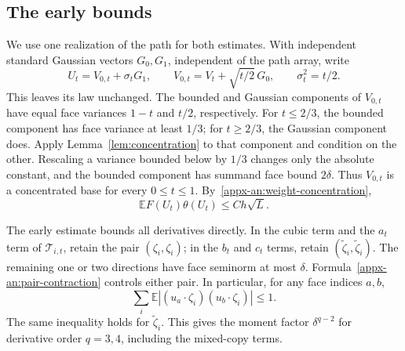 \documentclass[11pt,letterpaper]{article}
\theoremstyle{remark}
\newcommand{\E}{\mathbb E}
\begin{document}
\subsection{The early bounds}
\label{appx-an:sec:early}

We use one realization of the path for both estimates. With independent
standard Gaussian vectors \(G_0,G_1\), independent of the path array,
write
\begin{equation}
 U_t=V_{0,t}+\sigma_t G_1,\qquad
 V_{0,t}=V_t+\sqrt{t/2}\,G_0,\qquad
 \sigma_t^2=t/2.
 \label{appx-an:gaussian-split}
\end{equation}
This leaves its law unchanged. The bounded and Gaussian components
of \(V_{0,t}\) have equal face variances \(1-t\) and
\(t/2\), respectively. For \(t\le2/3\), the bounded component
has face variance at least \(1/3\); for \(t\ge2/3\), the Gaussian
component does. Apply Lemma~\ref{lem:concentration} to that component
and condition on the other. Rescaling a variance bounded below by
\(1/3\) changes only the absolute constant, and the bounded component
has summand face bound \(2\delta\). Thus \(V_{0,t}\) is a concentrated
base for every \(0\le t\le1\).
By~\eqref{appx-an:weight-concentration},
\begin{equation}
 \E F(U_t)\theta(U_t)\le Ch\sqrt L.
 \label{appx-an:path-weight}
\end{equation}

The early estimate bounds all derivatives directly. In the cubic
term and the \(a_t\) term of \(\mathcal T_{i,t}\), retain the pair
\((\zeta_i,\zeta_i)\); in the \(b_t\) and \(c_t\) terms, retain
\((\widetilde\zeta_i,\widetilde\zeta_i)\). The remaining one or two
directions have face seminorm at most \(\delta\).
Formula~\eqref{appx-an:pair-contraction} controls either pair. In
particular, for any face indices \(a,b\),
\[
 \sum_i\E|(u_a\cdot\zeta_i)(u_b\cdot\zeta_i)|\le1.
\]
The same inequality holds for \(\widetilde\zeta_i\). This gives the
moment factor \(\delta^{q-2}\) for derivative order \(q=3,4\),
including the mixed-copy terms.
\end{document}
